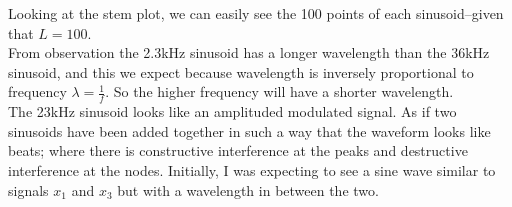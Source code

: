 \documentclass{article}
\begin{document}
        Looking at the stem plot, we can easily see the 100 points of each sinusoid--given that $L=100$.\\
        \vspace{5mm}
        From observation the 2.3kHz sinusoid has a longer wavelength than the 36kHz sinusoid, and this we expect because wavelength is inversely proportional to frequency $\lambda=\frac{1}{f}$. So the higher frequency will have a shorter wavelength.\\
        The 23kHz sinusoid looks like an amplituded modulated signal. As if two sinusoids have been added together in such a way that the waveform looks like beats; where there is constructive interference at the peaks and destructive interference at the nodes. Initially, I was expecting to see a sine wave similar to signals $x_1$ and $x_3$ but with a wavelength in between the two.
        
\end{document}
